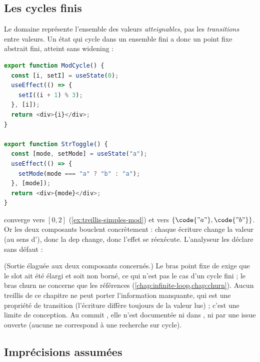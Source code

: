 \subsection{Les cycles finis}

Le domaine représente l'ensemble des valeurs \emph{atteignables}, pas les
\emph{transitions} entre valeurs. Un état qui cycle dans un ensemble fini a
donc un point fixe abstrait fini, atteint sans widening :

\begin{lstlisting}[language=TypeScript,caption={Deux cycles finis (\file{/tmp/ch09/limits.tsx}, extrait)},label={lst:treillis-simples-cycles}]
export function ModCycle() {
  const [i, setI] = useState(0);
  useEffect(() => {
    setI((i + 1) % 3);
  }, [i]);
  return <div>{i}</div>;
}

export function StrToggle() {
  const [mode, setMode] = useState("a");
  useEffect(() => {
    setMode(mode === "a" ? "b" : "a");
  }, [mode]);
  return <div>{mode}</div>;
}
\end{lstlisting}

 converge vers $[0,2]$ (\cref{ex:treillis-simples-mod}) et
 vers $\{\code{"a"}, \code{"b"}\}$. Or les deux composants
bouclent concrètement : chaque écriture change la valeur (au sens
d'), donc la dep change, donc l'effet se réexécute.
L'analyseur les déclare sans défaut :


(Sortie élaguée aux deux composants concernés.) Le bras \og point fixe\fg{}
de  exige que le slot ait été élargi et soit non borné,
ce qui n'est pas le cas d'un cycle fini ; le bras \og churn\fg{} ne
concerne que les références (\cref{chap:infinite-loop,chap:churn}). Aucun
treillis de ce chapitre ne peut porter l'information manquante, qui est une
propriété de transition (\og l'écriture diffère toujours de la valeur
lue\fg{}) ; c'est une limite de conception. Au commit \snapshotCommit{},
elle n'est documentée ni dans , ni par une issue
ouverte (aucune ne correspond à une recherche sur \og cycle\fg{}).

\subsection{Imprécisions assumées}

